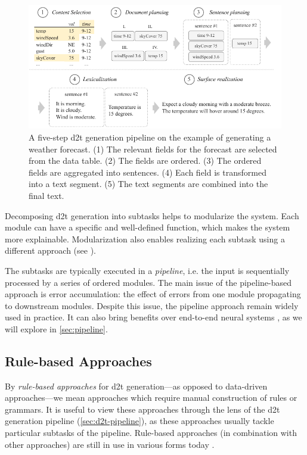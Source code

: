 {\begin{figure}[t]
    \centering
    \includegraphics[width=\textwidth]{img/pipeline.pdf}

    \caption{A five-step \ac{d2t} generation pipeline on the example of generating a weather forecast. (1) The relevant fields for the forecast are selected from the data table. (2) The fields are ordered. (3) The ordered fields are aggregated into sentences. (4) Each field is transformed into a text segment. (5) The text segments are combined into the final text.}\label{fig:pipeline}

\end{figure}


Decomposing \ac{d2t} generation into subtasks helps to modularize the system. Each module can have a specific and well-defined function, which makes the system more explainable. Modularization also enables realizing each subtask using a different approach (see ).

The subtasks are typically executed in a \emph{pipeline}, i.e. the input is sequentially processed by a series of ordered modules. The main issue of the pipeline-based approach is error accumulation: the effect of errors from one module propagating to downstream modules. Despite this issue, the pipeline approach remain widely used in practice. It can also bring benefits over end-to-end neural systems \cite{ferreiraNeuralDatatotextGeneration2019}, as we will explore in \autoref{sec:pipeline}.


\subsection{Rule-based Approaches}
\label{sec:rule-d2t}

By \emph{rule-based approaches} for \ac{d2t} generation---as opposed to data-driven approaches---we mean approaches which require manual construction of rules or grammars. It is useful to view these approaches through the lens of the \ac{d2t} generation pipeline (\autoref{sec:d2t-pipeline}), as these approaches usually tackle particular subtasks of the pipeline. Rule-based approaches (in combination with other approaches) are still in use in various forms today \cite{gattSurveyStateArt2018,daleNaturalLanguageGeneration2020,daleNavigatingTextGeneration2023}.


}
